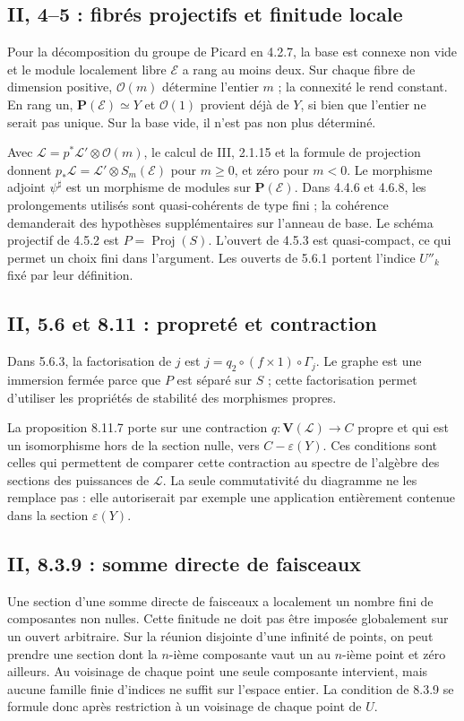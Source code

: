 \documentclass[11pt,a4paper]{article}
\begin{document}
\subsection{II, 4--5 : fibrés projectifs et finitude locale}
\label{note:base2-projective}
Pour la décomposition du groupe de Picard en 4.2.7, la base est
connexe non vide et le module localement libre $\mathcal E$ a
rang au moins deux. Sur chaque fibre de dimension positive,
$\mathcal O(m)$ détermine l'entier $m$ ; la connexité le rend
constant. En rang un, $\mathbf P(\mathcal E)\simeq Y$ et
$\mathcal O(1)$ provient déjà de $Y$, si bien que l'entier ne serait
pas unique. Sur la base vide, il n'est pas non plus déterminé.

Avec $\mathcal L=p^*\mathcal L'\otimes\mathcal O(m)$,
le calcul de III, 2.1.15 et la formule de projection donnent
$p_*\mathcal L=\mathcal L'\otimes S_m(\mathcal E)$ pour $m\geq0$,
et zéro pour $m<0$. Le morphisme adjoint $\psi^\sharp$ est un
morphisme de modules sur $\mathbf P(\mathcal E)$.
Dans 4.4.6 et 4.6.8, les prolongements utilisés sont
quasi-cohérents de type fini ; la cohérence demanderait des
hypothèses supplémentaires sur l'anneau de base.
Le schéma projectif de 4.5.2 est $P=\operatorname{Proj}(S)$.
L'ouvert de 4.5.3 est quasi-compact, ce qui permet un choix fini
dans l'argument. Les ouverts de 5.6.1 portent l'indice $U''_k$
fixé par leur définition.

\subsection{II, 5.6 et 8.11 : propreté et contraction}
\label{note:base2-proper}
Dans 5.6.3, la factorisation de $j$ est
$j=q_2\circ(f\times1)\circ\Gamma_j$.
Le graphe est une immersion fermée parce que $P$ est séparé sur
$S$ ; cette factorisation permet d'utiliser les propriétés de
stabilité des morphismes propres.

La proposition 8.11.7 porte sur une contraction
$q:\mathbf V(\mathcal L)\to C$ propre et qui est un isomorphisme
hors de la section nulle, vers $C-\varepsilon(Y)$.
Ces conditions sont celles qui permettent de comparer cette
contraction au spectre de l'algèbre des sections des puissances
de $\mathcal L$. La seule commutativité du diagramme ne les
remplace pas : elle autoriserait par exemple une application
entièrement contenue dans la section $\varepsilon(Y)$.

\subsection{II, 8.3.9 : somme directe de faisceaux}
\label{note:base2-sheafsum}
Une section d'une somme directe de faisceaux a localement un
nombre fini de composantes non nulles. Cette finitude ne doit
pas être imposée globalement sur un ouvert arbitraire.
Sur la réunion disjointe d'une infinité de points, on peut
prendre une section dont la $n$-ième composante vaut un au
$n$-ième point et zéro ailleurs. Au voisinage de chaque point
une seule composante intervient, mais aucune famille finie
d'indices ne suffit sur l'espace entier.
La condition de 8.3.9 se formule donc après restriction à un
voisinage de chaque point de $U$.
\end{document}
